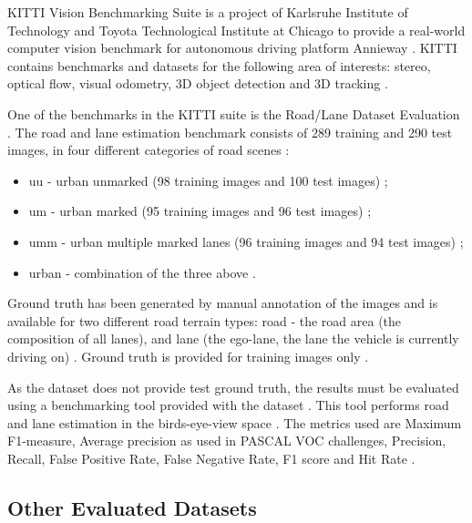 \documentclass[10pt,twocolumn,letterpaper]{article}
\begin{document}
KITTI Vision Benchmarking Suite is a project of Karlsruhe Institute of Technology and Toyota Technological Institute at Chicago to provide a real-world computer vision benchmark for autonomous driving platform Annieway \cite{KITTI_FULL} \cite{KITTI_WEBSITE}. KITTI contains benchmarks and datasets for the following area of interests: stereo, optical flow, visual odometry, 3D object detection and 3D tracking \cite{KITTI_WEBSITE}.

One of the benchmarks in the KITTI suite is the Road/Lane Dataset Evaluation \cite{KITTI}. The road and lane estimation benchmark consists of 289 training and 290 test images, in four different categories of road scenes \cite{KITTI}:

\begin{itemize}
 \item uu - urban unmarked (98 training images and 100 test images) \cite{KITTI};
 \item um - urban marked (95 training images and 96 test images) \cite{KITTI};
 \item umm - urban multiple marked lanes (96 training images and 94 test images) \cite{KITTI};
 \item urban - combination of the three above \cite{KITTI}.
\end{itemize}

Ground truth has been generated by manual annotation of the images and is available for two different road terrain types: road - the road area (the composition of all lanes), and lane (the ego-lane, the lane the vehicle is currently driving on) \cite{KITTI} \cite{KITTI_WEBSITE}. Ground truth is provided for training images only \cite{KITTI}. 

As the dataset does not provide test ground truth, the results must be evaluated using a benchmarking tool provided with the dataset \cite{KITTI_WEBSITE}. This tool  performs road and lane estimation in the birds-eye-view space \cite{KITTI} \cite{KITTI_WEBSITE}. The metrics used are Maximum F1-measure, Average precision as used in PASCAL VOC challenges, Precision, Recall, False Positive Rate, False Negative Rate, F1 score and Hit Rate \cite{KITTI} \cite{KITTI_WEBSITE}.

\subsection{Other Evaluated Datasets} \label{ssec:other_datasets}
\end{document}
